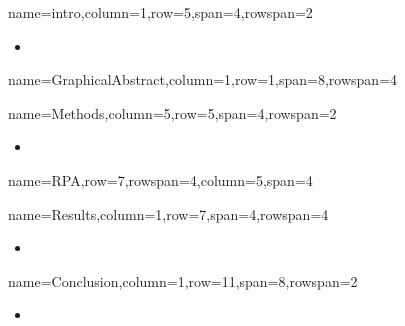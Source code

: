 \documentclass[
	accentcolor=3c,
	boxstyle=colored %
	]{tudasciposter}
\begin{document}
\begin{tcbposter}[
	poster={
		columns=8,
		rows=12,
		spacing=1cm,
	},]

\begin{posterboxenv}[title=1. Introduction]{name=intro,column=1,row=5,span=4,rowspan=2}
	\begin{itemize}
		\item 
	\end{itemize}
\end{posterboxenv}

\begin{posterboxenv}{name=GraphicalAbstract,column=1,row=1,span=8,rowspan=4}
\end{posterboxenv}

\begin{posterboxenv}[title=2. Methods]{name=Methods,column=5,row=5,span=4,rowspan=2}
	\begin{itemize}
		\item 
	\end{itemize}

\end{posterboxenv}

\begin{posterboxenv}{name=RPA,row=7,rowspan=4,column=5,span=4}
\end{posterboxenv}
\begin{posterboxenv}[title=3. Results]{name=Results,column=1,row=7,span=4,rowspan=4}
	\begin{itemize}
		\item 
	\end{itemize}
\end{posterboxenv}

\begin{posterboxenv}[title=4. Conclusion]{name=Conclusion,column=1,row=11,span=8,rowspan=2}
\begin{multicols}{2}		
	\begin{itemize}
		\item 
	\end{itemize}
\end{multicols}

\end{posterboxenv}

\end{tcbposter}
\end{document}
